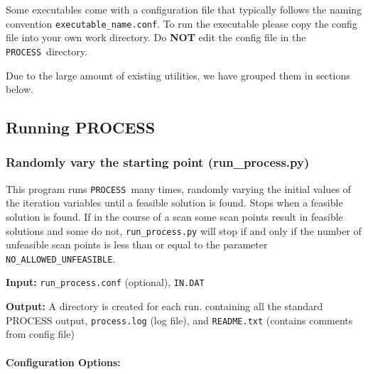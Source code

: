 \documentclass[11pt,a4paper]{article}
\newcommand{\indat}{\mbox{\texttt{IN.DAT}}}
\newcommand{\process}{\mbox{\texttt{PROCESS}}}
\begin{document}
Some executables come with a configuration file that typically follows the
naming convention \texttt{executable\_name.conf}. To run the executable please
copy the config file into your own work directory. Do \textbf{NOT} edit
the config file in the \process\ directory.

Due to the large amount of existing utilities, we have grouped them in sections below.


\subsection{Running PROCESS}

\subsubsection{Randomly vary the starting point (run\_process.py)}
\label{subsec:run_process}
This program runs \process\ many times, randomly varying the initial values of the iteration variables until a feasible solution is found.  Stops when a feasible solution is found.  If in the course of a scan some scan points result in feasible solutions and some do not, \texttt{run\_process.py} will stop if and only if the number of unfeasible scan points is less than or equal to the parameter \texttt{NO\_ALLOWED\_UNFEASIBLE}.

\begin{description}
\item{\textbf{Input:}}
\texttt{run\_process.conf} (optional), \indat\

\item{\textbf{Output:}} A directory is created for each run. containing all the standard
  PROCESS output, \texttt{process.log} (log file), and \texttt{README.txt}
  (contains comments from config file)
\end{description}

\paragraph{Configuration Options:}
\end{document}
